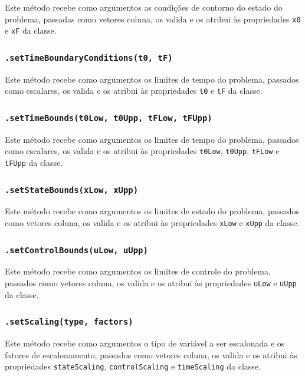 Este método recebe como argumentos as condições de contorno do estado do problema, passadas como vetores coluna, os valida e os atribui às propriedades \texttt{x0} e \texttt{xF} da classe.


\subsubsection{\texttt{.setTimeBoundaryConditions(t0, tF)}}
\label{subsubsec:settimeboundaryconditions}

Este método recebe como argumentos os limites de tempo do problema, passados como escalares, os valida e os atribui às propriedades \texttt{t0} e \texttt{tF} da classe.

\subsubsection{\texttt{.setTimeBounds(t0Low, t0Upp, tFLow, tFUpp)}}
\label{subsubsec:settimebounds}

Este método recebe como argumentos os limites de tempo do problema, passados como escalares, os valida e os atribui às propriedades \texttt{t0Low}, \texttt{t0Upp}, \texttt{tFLow} e \texttt{tFUpp} da classe.

\subsubsection{\texttt{.setStateBounds(xLow, xUpp)}}
\label{subsubsec:setstatebounds}

Este método recebe como argumentos os limites de estado do problema, passados como vetores coluna, os valida e os atribui às propriedades \texttt{xLow} e \texttt{xUpp} da classe.

\subsubsection{\texttt{.setControlBounds(uLow, uUpp)}}
\label{subsubsec:setcontrolbounds}

Este método recebe como argumentos os limites de controle do problema, passados como vetores coluna, os valida e os atribui às propriedades \texttt{uLow} e \texttt{uUpp} da classe.

\subsubsection{\texttt{.setScaling(type, factors)}}
\label{subsubsec:setscaling}

Este método recebe como argumentos o tipo de variável a ser escalonada e os fatores de escalonamento, passados como vetores coluna, os valida e os atribui às propriedades \texttt{stateScaling}, \texttt{controlScaling} e \texttt{timeScaling} da classe.

